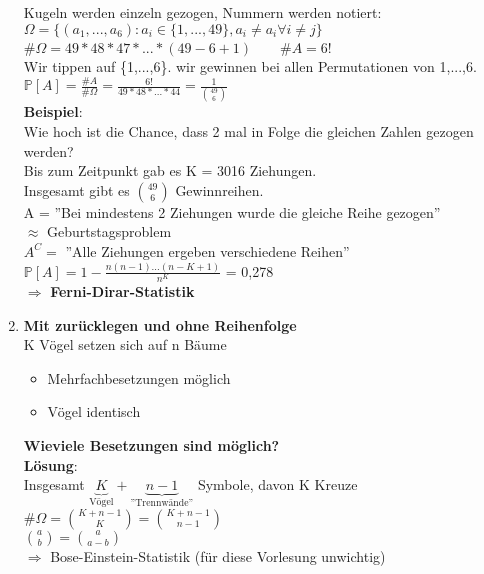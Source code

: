 \begin{enumerate}
	Kugeln werden einzeln gezogen, Nummern werden notiert:\\
	$\Omega = \{(a_1,...,a_6):a_i \in \{1,...,49\},a_i \neq a_i \forall i \neq j\}$\smallskip\\
	\#$\Omega = 49*48*47*...*(49-6+1) \qquad \#A = 6! $\medskip\\
	Wir tippen auf \{1,...,6\}. wir gewinnen bei allen Permutationen von 1,...,6.\\
	$\mathds{P}[A] = \frac{\#A}{\#\Omega}=\frac{6!}{49*48*...*44} = \frac{1}{\binom{49}{6}}$\medskip\\
	\textbf{Beispiel}:\\ Wie hoch ist die Chance, dass 2 mal in Folge die gleichen Zahlen gezogen werden?\\
	Bis zum Zeitpunkt gab es K = 3016 Ziehungen.\\
	Insgesamt gibt es $\binom{49}{6}$ Gewinnreihen.\\
	A = ''Bei mindestens 2 Ziehungen wurde die gleiche Reihe gezogen''\\$\approx$ Geburtstagsproblem\\
	$A^C = $ ''Alle Ziehungen ergeben verschiedene Reihen''\\
	$\mathds{P}[A] = 1 - \frac{n(n-1)...(n-K+1)}{n^K}$ = 0,278\\
	$\Rightarrow$ \textbf{Ferni-Dirar-Statistik}
	\newpage
	\item \textbf{Mit zurücklegen und ohne Reihenfolge}\\
	K Vögel setzen sich auf n Bäume
	\begin{itemize}
		\item 	Mehrfachbesetzungen möglich
		\item 	Vögel identisch
	\end{itemize}
	\textbf{Wieviele Besetzungen sind möglich?}\medskip\\
	\textbf{Lösung}:\\
	Insgesamt $\underbrace{K}_\text{Vögel}+\underbrace{n-1}_\text{''Trennwände''}$ Symbole, davon K Kreuze\medskip\\
	\#$\Omega = \binom{K+n-1}{K} = \binom{K+n-1}{n-1} $\medskip\\
	$\binom{a}{b} = \binom{a}{a-b}$\smallskip\\
	$\Rightarrow$ Bose-Einstein-Statistik (für diese Vorlesung unwichtig)
\end{enumerate}


